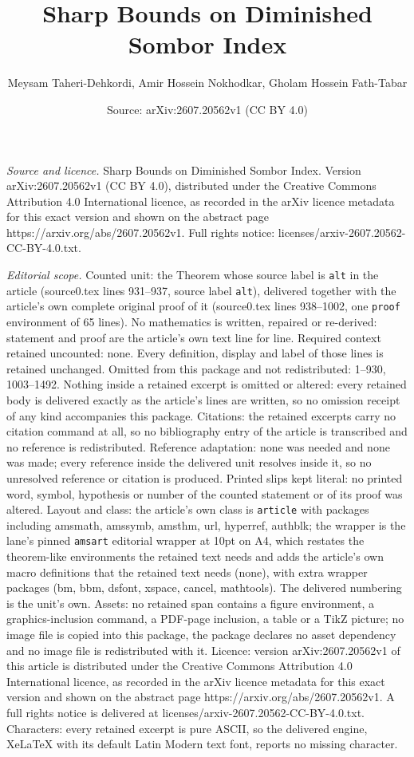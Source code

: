 \documentclass[10pt,a4paper]{amsart}
\title[Sharp Bounds on Diminished Sombor Index]{Sharp Bounds on Diminished Sombor Index}
\author{Meysam Taheri-Dehkordi, Amir Hossein Nokhodkar, Gholam Hossein Fath-Tabar}
\date{Source: arXiv:2607.20562v1 (CC BY 4.0)}
\begin{document}
\maketitle

\noindent\emph{Source and licence.} Sharp Bounds on Diminished Sombor Index. Version arXiv:2607.20562v1 (CC BY 4.0), distributed under the Creative Commons Attribution 4.0 International licence, as recorded in the arXiv licence metadata for this exact version and shown on the abstract page https://arxiv.org/abs/2607.20562v1. Full rights notice: licenses/arxiv-2607.20562-CC-BY-4.0.txt.\par\smallskip

\noindent\textit{Editorial scope.} Counted unit: the Theorem whose source label is \texttt{alt} in the article (source0.tex lines 931--937, source label \texttt{alt}), delivered together with the article's own complete original proof of it (source0.tex lines 938--1002, one \texttt{proof} environment of 65 lines). No mathematics is written, repaired or re-derived: statement and proof are the article's own text line for line. Required context retained uncounted: none. Every definition, display and label of those lines is retained unchanged. Omitted from this package and not redistributed: 1--930, 1003--1492. Nothing inside a retained excerpt is omitted or altered: every retained body is delivered exactly as the article's lines are written, so no omission receipt of any kind accompanies this package. Citations: the retained excerpts carry no citation command at all, so no bibliography entry of the article is transcribed and no reference is redistributed. Reference adaptation: none was needed and none was made; every reference inside the delivered unit resolves inside it, so no unresolved reference or citation is produced. Printed slips kept literal: no printed word, symbol, hypothesis or number of the counted statement or of its proof was altered. Layout and class: the article's own class is \texttt{article} with packages including amsmath, amssymb, amsthm, url, hyperref, authblk; the wrapper is the lane's pinned \texttt{amsart} editorial wrapper at 10pt on A4, which restates the theorem-like environments the retained text needs and adds the article's own macro definitions that the retained text needs (none), with extra wrapper packages (bm, bbm, dsfont, xspace, cancel, mathtools). The delivered numbering is the unit's own. Assets: no retained span contains a figure environment, a graphics-inclusion command, a PDF-page inclusion, a table or a TikZ picture; no image file is copied into this package, the package declares no asset dependency and no image file is redistributed with it. Licence: version arXiv:2607.20562v1 of this article is distributed under the Creative Commons Attribution 4.0 International licence, as recorded in the arXiv licence metadata for this exact version and shown on the abstract page https://arxiv.org/abs/2607.20562v1. A full rights notice is delivered at licenses/arxiv-2607.20562-CC-BY-4.0.txt. Characters: every retained excerpt is pure ASCII, so the delivered engine, XeLaTeX with its default Latin Modern text font, reports no missing character.
\end{document}
